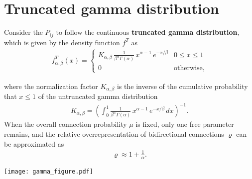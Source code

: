 
\section*{Truncated gamma distribution}

Consider the $P_{ij}$ to follow the continuous \textbf{truncated gamma distribution}, which is given by the density function $f^T$ as
\begin{align}
  f_{\alpha,\beta}^T(x) = \begin{cases} K_{\alpha, \beta}\,
\frac{1}{\beta^{\alpha}\Gamma(\alpha)}\, x^{\alpha-1}\,e^{-x/\beta} & 0 \leq x \leq 1 \\
0 & \text{otherwise},
\end{cases}
\end{align}

where the normalization factor $K_{\alpha,\beta}$ is the inverse of the cumulative
probability that $x \leq 1$ of the untruncated gamma distribution 
\begin{align}
  K_{\alpha,\beta} = \left(\int_0^{1} \frac{1}{\beta^{\alpha}\Gamma(\alpha)}\, x^{\alpha-1}\,e^{-x/\beta} \, dx \right)^{-1}.
\end{align}
When the overall connection probability $\mu$ is fixed, only one free parameter remains, and the relative overrepresentation of bidirectional connections $\varrho$ can be approximated as
\begin{align}
 \varrho \approx  1 + \frac{1}{\alpha}.
\end{align}

\begin{center}\vspace{1cm}
\texttt{[image: gamma\_figure.pdf]}
\end{center}\vspace{1cm}

